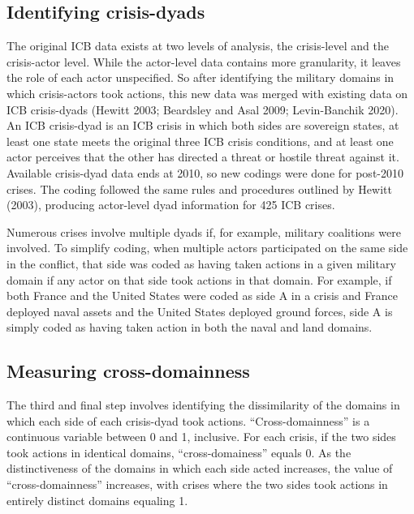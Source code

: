 \documentclass[
]{article}
\begin{document}
\hypertarget{identifying-crisis-dyads}{%
\subsection{Identifying crisis-dyads}\label{identifying-crisis-dyads}}

The original ICB data exists at two levels of analysis, the crisis-level and the crisis-actor level. While the actor-level data contains more granularity, it leaves the role of each actor unspecified. So after identifying the military domains in which crisis-actors took actions, this new data was merged with existing data on ICB crisis-dyads (Hewitt 2003; Beardsley and Asal 2009; Levin-Banchik 2020). An ICB crisis-dyad is an ICB crisis in which both sides are sovereign states, at least one state meets the original three ICB crisis conditions, and at least one actor perceives that the other has directed a threat or hostile threat against it. Available crisis-dyad data ends at 2010, so new codings were done for post-2010 crises. The coding followed the same rules and procedures outlined by Hewitt (2003), producing actor-level dyad information for 425 ICB crises.

Numerous crises involve multiple dyads if, for example, military coalitions were involved. To simplify coding, when multiple actors participated on the same side in the conflict, that side was coded as having taken actions in a given military domain if any actor on that side took actions in that domain. For example, if both France and the United States were coded as side A in a crisis and France deployed naval assets and the United States deployed ground forces, side A is simply coded as having taken action in both the naval and land domains.

\hypertarget{measuring-cross-domainness}{%
\subsection{Measuring cross-domainness}\label{measuring-cross-domainness}}

The third and final step involves identifying the dissimilarity of the domains in which each side of each crisis-dyad took actions. ``Cross-domainness'' is a continuous variable between 0 and 1, inclusive. For each crisis, if the two sides took actions in identical domains, ``cross-domainess'' equals 0. As the distinctiveness of the domains in which each side acted increases, the value of ``cross-domainness'' increases, with crises where the two sides took actions in entirely distinct domains equaling 1.
\end{document}
